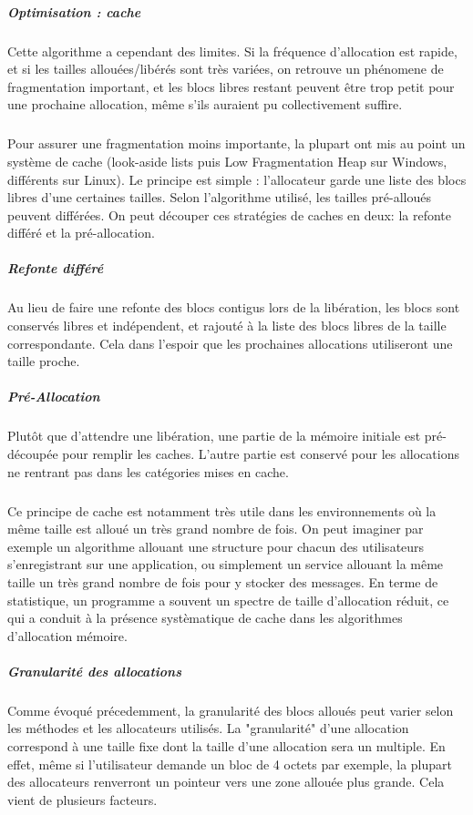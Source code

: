 \subparagraph{Optimisation : cache}
Cette algorithme a cependant des limites. Si la fréquence d'allocation est rapide, et si les tailles allouées/libérés sont très variées, on retrouve un phénomene de
fragmentation important, et les blocs libres restant peuvent être trop petit pour une prochaine allocation, même s'ils auraient pu collectivement suffire.
\subparagraph{}
Pour assurer une fragmentation moins importante, la plupart ont mis au point un système de cache (look-aside lists puis Low Fragmentation Heap sur Windows, différents sur Linux).
Le principe est simple : l'allocateur garde une liste des blocs libres d'une certaines tailles. Selon l'algorithme utilisé, les tailles pré-alloués peuvent différées.
On peut découper ces stratégies de caches en deux: la refonte différé et la pré-allocation.

\subparagraph{Refonte différé}
Au lieu de faire une refonte des blocs contigus lors de la libération, les blocs sont conservés libres et indépendent, et rajouté à la liste des blocs libres de
la taille correspondante. Cela dans l'espoir que les prochaines allocations utiliseront une taille proche.

\subparagraph{Pré-Allocation}
Plutôt que d'attendre une libération, une partie de la mémoire initiale est pré-découpée pour remplir les caches. L'autre partie est conservé pour les allocations
ne rentrant pas dans les catégories mises en cache.

\subparagraph{}
Ce principe de cache est notamment très utile dans les environnements où la même taille est alloué un très grand nombre de fois. On peut imaginer par exemple un
algorithme allouant une structure pour chacun des utilisateurs s'enregistrant sur une application, ou simplement un service allouant la même taille un très grand nombre
de fois pour y stocker des messages. En terme de statistique, un programme a souvent un spectre de taille d'allocation réduit, ce qui a conduit à la présence systèmatique de
cache dans les algorithmes d'allocation mémoire.


\subparagraph{Granularité des allocations}
Comme évoqué précedemment, la granularité des blocs alloués peut varier selon les méthodes et les allocateurs utilisés. La "granularité" d'une allocation
correspond à une taille fixe dont la taille d'une allocation sera un multiple. En effet, même si l'utilisateur demande un bloc de 4 octets par exemple, la plupart
des allocateurs renverront un pointeur vers une zone allouée plus grande. Cela vient de plusieurs facteurs.

